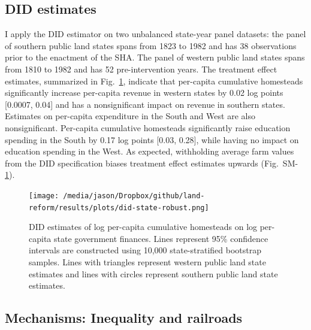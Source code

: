 \documentclass[12pt]{article}
\begin{document}
{\subsection{DID estimates}
I apply the DID estimator on two unbalanced state-year panel datasets: the panel of southern public land states spans  from 1823 to 1982 and has 38 observations prior to the enactment of the SHA. The panel of western public land states spans from 1810 to 1982 and has 52 pre-intervention years. The treatment effect estimates, summarized in Fig.~\ref{fig:did-state-robust}, indicate that per-capita cumulative homesteads significantly increase per-capita revenue in western states by 0.02 log points [0.0007, 0.04] and has a nonsignificant impact on revenue in southern states. Estimates on per-capita expenditure in the South and West are also nonsignificant. Per-capita cumulative homesteads significantly raise education spending in the South by 0.17 log points [0.03, 0.28], while having no impact on education spending in the West. As expected, withholding average farm values from the DID specification biases treatment effect estimates upwards (Fig.~SM-\ref{fig:did-state-robust}).

\begin{figure}[htbp]
	\begin{center}
		\texttt{[image: /media/jason/Dropbox/github/land-reform/results/plots/did-state-robust.png]}
	\end{center}
	\caption{DID estimates of log per-capita cumulative homesteads on log per-capita state government finances. Lines represent 95\% confidence intervals are constructed using 10,000 state-stratified bootstrap samples. Lines with triangles represent western public land state estimates and lines with circles represent southern public land state estimates.  \label{fig:did-state-robust}}
\end{figure}

%

\subsection{Mechanisms: Inequality and railroads}  \label{mechanisms}

}
\end{document}
